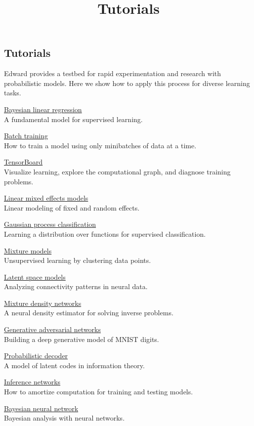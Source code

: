 \title{Tutorials}

\subsection{Tutorials}

Edward provides a testbed for rapid experimentation and research with
probabilistic models. Here we show how to apply this process for
diverse learning tasks.

\href{supervised-regression}{Bayesian linear regression} \\
A fundamental model for supervised learning.

\href{batch-training}{Batch training} \\
How to train a model using only minibatches of data at a time.

\href{tensorboard}{TensorBoard} \\
Visualize learning, explore the computational graph, and diagnose training problems.

\href{linear-mixed-effects-models}{Linear mixed effects models} \\
Linear modeling of fixed and random effects.

\href{supervised-classification}{Gaussian process classification} \\
Learning a distribution over functions for supervised classification.

\href{unsupervised}{Mixture models} \\
Unsupervised learning by clustering data points.

\href{latent-space-models}{Latent space models} \\
Analyzing connectivity patterns in neural data.

\href{mixture-density-network}{Mixture density networks} \\
A neural density estimator for solving inverse problems.

\href{gan}{Generative adversarial networks} \\
Building a deep generative model of MNIST digits.

\href{decoder}{Probabilistic decoder} \\
A model of latent codes in information theory.

\href{inference-networks}{Inference networks} \\
How to amortize computation for training and testing models.

\href{bayesian-neural-network}{Bayesian neural network} \\
Bayesian analysis with neural networks.


